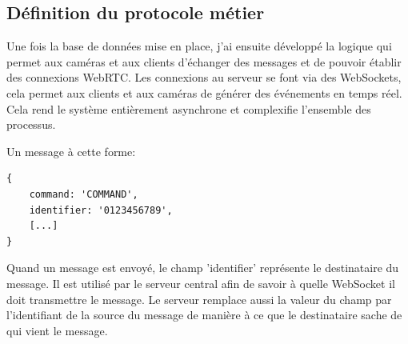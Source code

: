 \documentclass[12pt, a4paper]{report}
\begin{document}
\subsection{Définition du protocole métier}
Une fois la base de données mise en place, j'ai ensuite développé la logique qui permet aux caméras et aux clients d'échanger des messages et de pouvoir établir des connexions WebRTC.\newline
Les connexions au serveur se font via des WebSockets, cela permet aux clients et aux caméras de générer des événements en temps réel.\newline
Cela rend le système entièrement asynchrone et complexifie l'ensemble des processus.\newline

Un message à cette forme:
\begin{verbatim}
{
    command: 'COMMAND',
    identifier: '0123456789',
    [...]
}
\end{verbatim}

Quand un message est envoyé, le champ 'identifier' représente le destinataire du message. Il est utilisé par le serveur central afin de savoir à quelle WebSocket il doit transmettre le message. Le serveur remplace aussi la valeur du champ par l'identifiant de la source du message de manière à ce que le destinataire sache de qui vient le message.\newline
\end{document}
